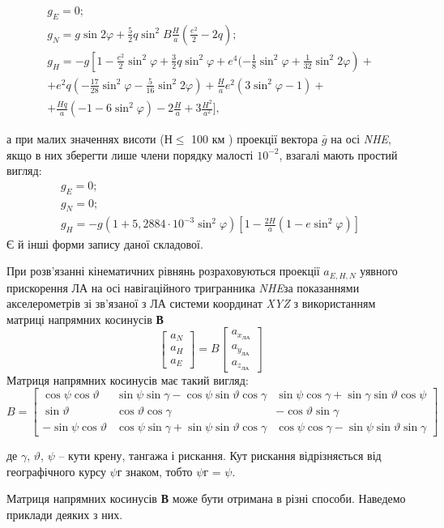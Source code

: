 \[\begin{array}{l} 
{ g_{E} =0;} \\ 
{g_{N} =g\sin 2\varphi+\frac{5}{2} q\sin ^{2} B\frac{H}{a}(\frac{e^{2}}{2} -2q);} \\ 
{g_{H} =-g\left[1-\frac{e^{2}}{2}\sin ^{2} \varphi+\frac{3}{2} q\sin ^{2} \varphi+e^{4}(-\frac{1}{8} \sin ^{2} \varphi+\frac{1}{32} 
\sin ^{2} 2\varphi\right)+} \\ 
{ +e^{2} q\left(-\frac{17}{28} 
\sin ^{2} \varphi-\frac{5}{16} \sin ^{2} 2\varphi\right)+\frac{H}{a} e^{2} (3\sin ^{2} \varphi-1)+}\\ 
{ +\frac{Hq}{a} (-1-6\sin ^{2}\varphi)-2\frac{H}{a} +3\frac{H^{2}}{a^{2}}],} 
\end{array}\] 

а при малих значеннях висоти ($Н\leq$ 100 км ) проекції вектора  $\bar{g}$ на 
осі \textit{NHE}, якщо в них зберегти лише члени порядку малості $10^{-2}$, 
взагалі мають простий вигляд: 
\[\begin{array}{l} 
{g_{E} =0;}\\
{g_{N} =0;}\\ 
{g_{H} =-g(1+5,2884\cdot 10^{-3} \sin ^{2}\varphi)[1-\frac{2H}{a}
(1-e\sin^{2}\varphi )]} 
\end{array}\] 
Є й інші форми запису даної складової.

При розв'язанні кінематичних рівнянь розраховуються проекції $a_{E,H,N} $ уявного 
прискорення ЛА на осі навігаційного тригранника \textit{NHE}за показаннями акселерометрів 
зі зв'язаної з ЛА системи координат \textit{XYZ} з використанням матриці напрямних  
косинусів \textbf{В}
\[ \left[\begin{array}{c} 
{a_{N}} \\ 
{a_{H}} \\ 
{a_{E}}
\end{array}\right]=B
\left[\begin{array}{c} 
{a_{x_{\text{ЛА}}}} \\ 
{a_{y_{\text{ЛА}}}} \\ 
{a_{z_{\text{ЛА}}}} 
\end{array}\right]\] 
Матриця напрямних  косинусів  має такий вигляд:
\[B=\left[\begin{array}{c|c|c} 
{\cos \psi \cos \vartheta } & 
{\sin \psi \sin \gamma -\cos \psi \sin \vartheta \cos \gamma } & 
{\sin \psi \cos \gamma +\sin \gamma \sin \vartheta \cos \psi } \\  \hline {\sin \vartheta } & 
{\cos \vartheta \cos \gamma} & 
{-\cos \vartheta \sin \gamma } \\  \hline {-\sin \psi \cos \vartheta } & 
{\cos \psi \sin \gamma +\sin \psi \sin \vartheta \cos \gamma } & 
{\cos \psi \cos \gamma -\sin \psi \sin \vartheta \sin \gamma } 
\end{array}\right]\] 
\begin{ESKDexplanation}
\item де $\gamma$, $\vartheta$, $\psi$ -- кути крену, тангажа і рискання. Кут рискання 
відрізняється від географічного курсу $\psi$г знаком, тобто $\psi$г = $\psi$.
\end{ESKDexplanation}
Матриця напрямних  косинусів \textbf{В} може бути отримана в різні способи. Наведемо приклади 
деяких з них. 

